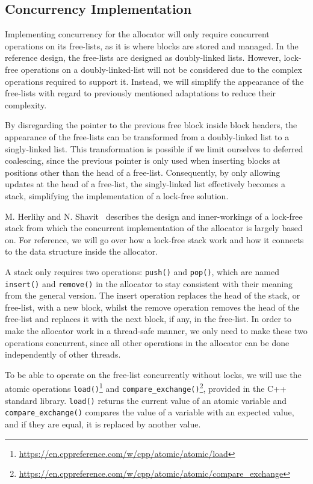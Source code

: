 \subsection{Concurrency Implementation}
\label{sec:adaptations_impl:concurrency}

Implementing concurrency for the allocator will only require concurrent operations on its free-lists, as it is where blocks are stored and managed. In the reference design, the free-lists are designed as doubly-linked lists. However, lock-free operations on a doubly-linked-list will not be considered due to the complex operations required to support it. Instead, we will simplify the appearance of the free-lists with regard to previously mentioned adaptations to reduce their complexity.

By disregarding the pointer to the previous free block inside block headers, the appearance of the free-lists can be transformed from a doubly-linked list to a singly-linked list. This transformation is possible if we limit ourselves to deferred coalescing, since the previous pointer is only used when inserting blocks at positions other than the head of a free-list. Consequently, by only allowing updates at the head of a free-list, the singly-linked list effectively becomes a stack, simplifying the implementation of a lock-free solution.

M. Herlihy and N. Shavit~\cite[Chapter 11]{artofmpprogramming} describes the design and inner-workings of a lock-free stack from which the concurrent implementation of the allocator is largely based on. For reference, we will go over how a lock-free stack work and how it connects to the data structure inside the allocator.

A stack only requires two operations: \texttt{push()} and \texttt{pop()}, which are named \texttt{insert()} and \texttt{remove()} in the allocator to stay consistent with their meaning from the general version. The insert operation replaces the head of the stack, or free-list, with a new block, whilst the remove operation removes the head of the free-list and replaces it with the next block, if any, in the free-list. In order to make the allocator work in a thread-safe manner, we only need to make these two operations concurrent, since all other operations in the allocator can be done independently of other threads.

To be able to operate on the free-list concurrently without locks, we will use the atomic operations \texttt{load()}\footnote{\url{https://en.cppreference.com/w/cpp/atomic/atomic/load}} and \texttt{compare\_exchange()}\footnote{\url{https://en.cppreference.com/w/cpp/atomic/atomic/compare_exchange}}, provided in the C++ standard library. \texttt{load()} returns the current value of an atomic variable and \texttt{compare\_exchange()} compares the value of a variable with an expected value, and if they are equal, it is replaced by another value.

